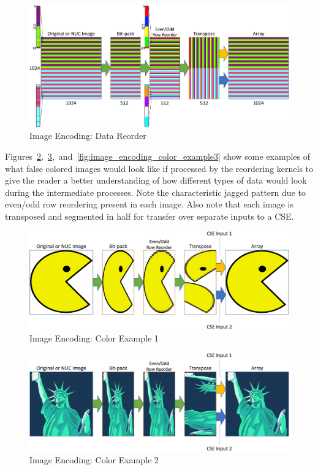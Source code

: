     \begin{figure}
        \centering
        \includegraphics[width=1.0\textwidth]{fig/image_encoding_reorder.pdf}
        \caption{Image Encoding: Data Reorder}
        \label{fig:image_encoding_bitpack_reorder}
    \end{figure}

    Figures~\ref{fig:image_encoding_color_example1},~\ref{fig:image_encoding_color_example2},~and~\ref{fig:image_encoding_color_example3} show some examples of what false colored images would look like if processed by the reordering kernels to give the reader a better understanding of how different types of data would look during the intermediate processes. Note the characteristic jagged pattern due to even/odd row reordering present in each image. Also note that each image is transposed and segmented in half for transfer over separate inputs to a CSE.

    \begin{figure}
        \centering
        \includegraphics[width=1.0\textwidth]{fig/image_encoding_pac.pdf}
        \caption{Image Encoding: Color Example 1}
        \label{fig:image_encoding_color_example1}
    \end{figure}

    \begin{figure}
        \centering
        \includegraphics[width=1.0\textwidth]{fig/image_encoding_liberty.pdf}
        \caption{Image Encoding: Color Example 2}
        \label{fig:image_encoding_color_example2}
    \end{figure}

